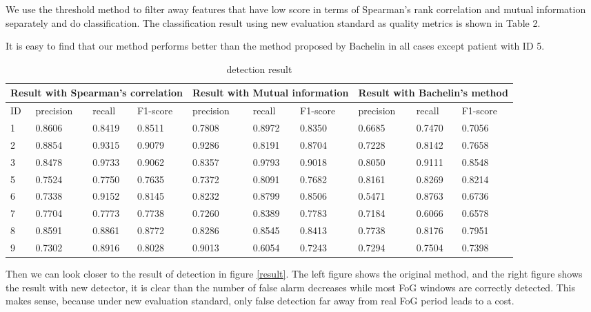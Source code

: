 \documentclass[article]{article}
\begin{document}
We use the threshold method to filter away features that have low score in terms of Spearman's rank correlation and mutual information separately and do classification. The classification result using new evaluation standard as quality metrics is shown in Table 2. 

It is easy to find that our method performs better than the method proposed by Bachelin in all cases except patient with ID 5. 

 \begin{table}
    \begin{center}
   		\begin{tabular}{  |p{0.5cm}||p{1.3cm}|p{1.3cm}|p{1.3cm}|p{1.3cm}|p{1.3cm}|p{1.3cm}|p{1.3cm}|p{1.3cm}|p{1.3cm}| }
		\hline
		\multicolumn{4}{|c|}{Result with Spearman's correlation} &\multicolumn{3}{|c|}{Result with Mutual information}&\multicolumn{3}{|c|}{Result with Bachelin's method}  \\
	
		\hline
		 ID &  precision &  recall &  F1-score &  precision &  recall &  F1-score &  precision &  recall &  F1-score\\
		\hline
		1 & 0.8606 &0.8419 & 0.8511 & 0.7808 &0.8972 & 0.8350 & 0.6685 &0.7470 & 0.7056 \\
		2 & 0.8854 &0.9315 & 0.9079 & 0.9286 &0.8191 & 0.8704  & 0.7228 &0.8142 & 0.7658\\ 
		
		3 & 0.8478 &0.9733 & 0.9062 & 0.8357 &0.9793 & 0.9018 & 0.8050 &0.9111 & 0.8548 \\   
		
		5 & 0.7524 &0.7750 & 0.7635  & 0.7372 &0.8091 & 0.7682  & 0.8161 &0.8269 & 0.8214 \\
		
		6 & 0.7338 &0.9152 & 0.8145 & 0.8232 &0.8799 & 0.8506 & 0.5471 &0.8763 & 0.6736 \\
		
		7 & 0.7704 &0.7773 & 0.7738 & 0.7260 &0.8389 & 0.7783&  0.7184 &0.6066 & 0.6578\\
		
		8 & 0.8591 &0.8861 & 0.8772 & 0.8286 &0.8545 & 0.8413 & 0.7738 &0.8176 & 0.7951   \\	
		
		9 & 0.7302 &0.8916 & 0.8028 & 0.9013 &0.6054 & 0.7243 & 0.7294 &0.7504 & 0.7398\\
		\hline
		\end{tabular}
	\caption{detection result}
\end{center}
     \end{table}
   Then we can look closer to the result of detection in figure \ref{result}. The left figure shows the original method, and the right figure shows the result with new detector, it is clear than the number of false alarm decreases while most FoG windows are correctly detected. This makes sense, because under new evaluation standard, only false detection far away from real FoG period leads to a cost.
   
\end{document}
